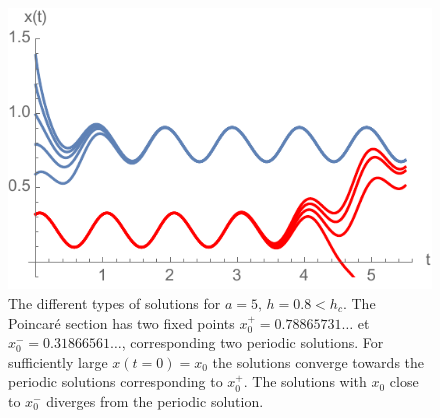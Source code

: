 \documentclass{article}
\begin{document}
\begin{question}
\begin{figure}[h]
  \centering
  \includegraphics[scale=.8]{PeriodicSolutions}
  \caption{The different types of solutions for $a=5,\,h=0.8<h_c$. The Poincar\'e section has two fixed points $x_0^+= 0.78865731\dots$ et $x_0^-= 0.31866561\dots$, corresponding two periodic solutions. For sufficiently large $x(t=0)=x_0$ the solutions converge towards the periodic solutions corresponding to $x_0^+$. The solutions with $x_0$ close to $x_0^-$ diverges from the periodic solution.}
  \label{fig:LogisticPeriodic}
\end{figure}

\end{question}
\end{document}
